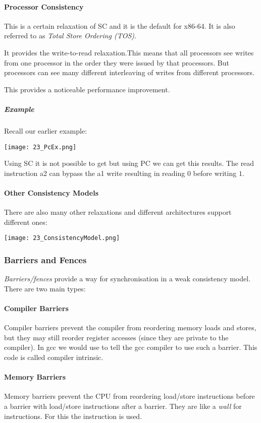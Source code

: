 \paragraph{Processor Consistency}
This is a certain relaxation of SC and it is the default for x86-64. It is also referred to as \textit{Total Store Ordering (TOS)}.

It provides the write-to-read relaxation.This means that all processors see writes from one processor in the order they were issued by that processors. But processors can see many different interleaving of writes from different processors.

This provides a noticeable performance improvement.

\subparagraph{Example}
Recall our earlier example:

\texttt{[image: 23\_PcEx.png]}

Using SC it is not possible to get  but using PC we can get this results. The read instruction a2 can bypass the a1 write resulting in reading $0$ before writing $1$.

\paragraph{Other Consistency Models}
There are also many other relaxations and different architectures support different ones:

\texttt{[image: 23\_ConsistencyModel.png]}

\subsubsection{Barriers and Fences}
\textit{Barriers/fences} provide a way for synchronisation in a weak consistency model. There are two main types:

\paragraph{Compiler Barriers}
Compiler barriers prevent the compiler from reordering memory loads and stores, but they may still reorder register accesses (since they are private to the compiler). In gcc we would use  to tell the gcc compiler to use such a barrier. This code is called compiler intrinsic.

\paragraph{Memory Barriers}
Memory barriers prevent the CPU from reordering load/store instructions before a barrier with load/store instructions after a barrier. They are like a \textit{wall} for instructions. For this the  instruction is used.


